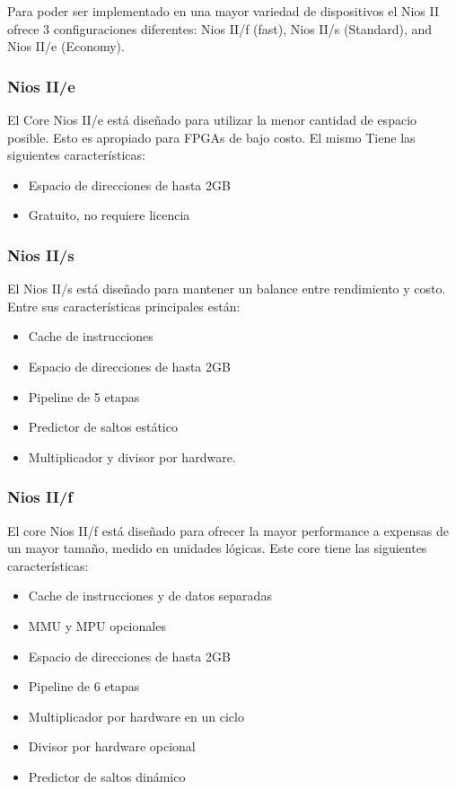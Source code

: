 Para poder ser implementado en una mayor variedad de dispositivos el Nios II ofrece 3 configuraciones diferentes:  Nios II/f (fast), Nios II/s (Standard), and Nios II/e (Economy).

\subsubsection{Nios II/e}
El Core Nios II/e está diseñado para utilizar la menor cantidad de espacio posible. Esto es apropiado para FPGAs de bajo costo. El mismo Tiene las siguientes características:
\begin{itemize}
	\item Espacio de direcciones de hasta 2GB
	\item Gratuito, no requiere licencia 
\end{itemize}

\subsubsection{Nios II/s}
El Nios II/s está diseñado para mantener un balance entre rendimiento y costo. Entre sus características principales están:

\begin{itemize}
	\item Cache de instrucciones
	\item Espacio de direcciones de hasta 2GB
	\item Pipeline de 5 etapas
	\item Predictor de saltos estático
	\item Multiplicador y divisor por hardware. 
\end{itemize}

\subsubsection{Nios II/f}
El core Nios II/f está diseñado para ofrecer la mayor performance a expensas de un mayor tamaño, medido en unidades lógicas. Este core tiene las siguientes características:

\begin{itemize}
	\item Cache de instrucciones y de datos separadas
	\item MMU y MPU opcionales
	\item Espacio de direcciones de hasta 2GB
	\item Pipeline de 6 etapas
	\item Multiplicador por hardware en un ciclo
	\item Divisor por hardware opcional
	\item Predictor de saltos dinámico
\end{itemize}

